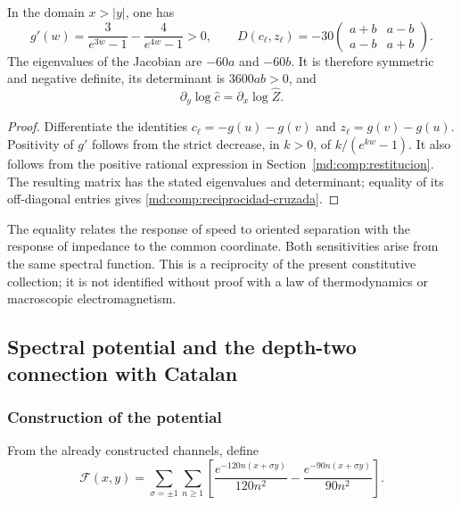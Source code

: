 \begin{proposition}
\label{md:comp:prop-reciprocidad}
In the domain \(x>|y|\), one has
\begin{equation}
 g'(w)=\frac{3}{e^{3w}-1}-\frac{4}{e^{4w}-1}>0,
 \qquad
 D(c_\ell,z_\ell)=-30
 \begin{pmatrix}a+b&a-b\\a-b&a+b\end{pmatrix}.
 \label{md:comp:jacobiano}
\end{equation}
The eigenvalues of the Jacobian are \(-60a\) and \(-60b\).
It is therefore symmetric and negative definite, its determinant is
\(3600ab>0\), and
\begin{equation}
 \boxed{\partial_y\log\widehat c=\partial_x\log\widehat Z.}
 \label{md:comp:reciprocidad-cruzada}
\end{equation}
\end{proposition}
\begin{proof}
Differentiate the identities
\(c_\ell=-g(u)-g(v)\) and \(z_\ell=g(v)-g(u)\).
Positivity of \(g'\) follows from the strict decrease, in \(k>0\),
of \(k/(e^{kw}-1)\). It also follows from the positive rational
expression in Section~\ref{md:comp:restitucion}. The resulting matrix
has the stated eigenvalues and determinant; equality of its off-diagonal
entries gives \eqref{md:comp:reciprocidad-cruzada}.
\end{proof}

The equality relates the response of speed to oriented separation
with the response of impedance to the common coordinate.
Both sensitivities arise from the same spectral function. This is a
reciprocity of the present constitutive collection; it is not identified
without proof with a law of thermodynamics or macroscopic electromagnetism.

\subsection{Spectral potential and the depth-two connection with Catalan}
\label{md:comp:potencial}

\subsubsection{Construction of the potential}
\label{md:comp:construccion-potencial}

From the already constructed channels, define
\begin{equation}
 \mathscr F(x,y)=\sum_{\sigma=\pm1}\sum_{n\geq1}
 \left[
 \frac{e^{-120n(x+\sigma y)}}{120n^2}
 -\frac{e^{-90n(x+\sigma y)}}{90n^2}
 \right].
 \label{md:comp:serie-potencial}
\end{equation}

